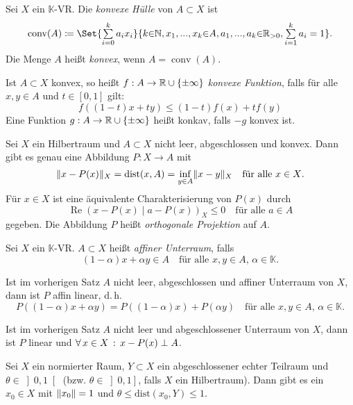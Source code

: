 \documentclass{cheat-sheet}
\newcommand{\K}{\mathbb{K}}
\newcommand{\dist}{\mathrm{dist}} %
\newcommand{\scp}[2]{\left( #1 \!\mid\! #2 \right)} %
\newcommand{\conv}{\mathop{\mathrm{conv}}} %
\renewcommand{\Re}{\operatorname{Re}} %
\begin{document}

\begin{defn}
  Sei $X$ ein $\K$-VR. Die \emph{konvexe Hülle} von $A \subset X$ ist
  \[ \conv(A) \coloneqq \Set{ \sum_{i=0}^k a_i x_i }{ k {\in} \N, x_1, ..., x_k {\in} A, a_1, ..., a_k {\in} \R_{> 0}, \sum_{i=1}^k a_i = 1 }. \]
  Die Menge $A$ heißt \emph{konvex}, wenn $A = \conv(A)$.
\end{defn}

\begin{defn}
  Ist $A \subset X$ konvex, so heißt $f : A \to \mathbb{R} \cup \{ \pm\infty \}$ \emph{konvexe Funktion}, falls für alle $x, y \in A$ und $t \in \left[ 0, 1 \right]$ gilt:
  \[ f((1{-}t)x + t y) \leq (1-t) f(x) + t f(y) \]
  Eine Funktion $g : A \to \mathbb{R} \cup \{ \pm \infty \}$ heißt konkav, falls $-g$ konvex ist.
\end{defn}

\begin{satz}
  Sei $X$ ein Hilbertraum und $A \subset X$ nicht leer, abgeschlossen und konvex. Dann gibt es genau eine Abbildung $P : X \to A$ mit
  \[ \norm{x - P(x)}_X = \dist(x, A) = \inf_{y \in A} \norm{x - y}_X \quad \text{für alle $x \in X$.} \]
  Für $x \in X$ ist eine äquivalente Charakterisierung von $P(x)$ durch
  \[ \Re \scp{x-P(x)}{a-P(x)}_X \leq 0 \quad \text{für alle $a \in A$} \]
  gegeben. Die Abbildung $P$ heißt \emph{orthogonale Projektion} auf $A$.
\end{satz}

\begin{defn}
  Sei $X$ ein $\K$-VR. $A \subset X$ heißt \emph{affiner Unterraum}, falls
  \[ (1{-}\alpha) x + \alpha y \in A \quad \text{für alle $x, y \in A$, $\alpha \in \K$.} \]
\end{defn}

\begin{satz}
  Ist im vorherigen Satz $A$ nicht leer, abgeschlossen und affiner Unterraum von $X$, dann ist $P$ affin linear, d.\,h.
  \[ P\left( (1{-}\alpha) x + \alpha y \right) = P \left( (1{-}\alpha) x \right) + P \left( \alpha y \right) \quad \text{für alle $x, y \in A$, $\alpha \in \K$.} \]
\end{satz}

\begin{satz}
  Ist im vorherigen Satz $A$ nicht leer und abgeschlossener Unterraum von $X$, dann ist $P$ linear und $\forall \, {x \in X} \,:\, x - P(x) \perp A$.
\end{satz}

\begin{satz}
  Sei $X$ ein normierter Raum, $Y \subset X$ ein abgeschlossener echter Teilraum und $\theta \in \left] 0, 1 \right[$ (bzw. $\theta \in \left] 0, 1 \right]$, falls $X$ ein Hilbertraum). Dann gibt es ein $x_0 \in X$ mit $\lVert x_0\rVert = 1$ und $\theta \leq \dist(x_0, Y) \leq 1$.
\end{satz}
\end{document}
